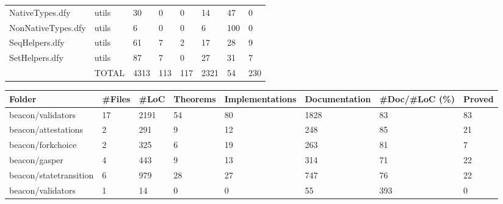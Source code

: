 \documentclass[a4paper, 12pt]{article}
\begin{document}
\begin{tabular}{llllllll}
         NativeTypes.dfy &                   utils &    30 &        0 &               0 &            14 &            47 &      0 \\
      NonNativeTypes.dfy &                   utils &     6 &        0 &               0 &             6 &           100 &      0 \\
          SeqHelpers.dfy &                   utils &    61 &        7 &               2 &            17 &            28 &      9 \\
          SetHelpers.dfy &                   utils &    87 &        7 &               0 &            27 &            31 &      7 \\
                         &                   TOTAL &  4313 &      113 &             117 &          2321 &            54 &    230 \\
\bottomrule
\end{tabular}

\vspace{2em}
\begin{tabular}{llllllll}
\toprule
                 Folder & \#Files &  \#LoC & Theorems & Implementations & Documentation & \#Doc/\#LoC (\%) & Proved \\
\midrule
      beacon/validators &     17 &  2191 &       54 &              80 &          1828 &            83 &     83 \\
    beacon/attestations &      2 &   291 &        9 &              12 &           248 &            85 &     21 \\
      beacon/forkchoice &      2 &   325 &        6 &              19 &           263 &            81 &      7 \\
          beacon/gasper &      4 &   443 &        9 &              13 &           314 &            71 &     22 \\
 beacon/statetransition &      6 &   979 &       28 &              27 &           747 &            76 &     22 \\
      beacon/validators &      1 &    14 &        0 &               0 &            55 &           393 &      0 \\
\bottomrule
\end{tabular}
\end{document}
